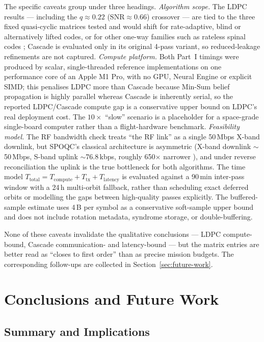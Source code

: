 \documentclass{UoYCSproject}
\begin{document}
The specific caveats group under three headings. \emph{Algorithm scope.}
The LDPC results --- including the $q \approx 0.22$
($\mathrm{SNR}\!\approx\!0.66$) crossover --- are tied to the three fixed
quasi-cyclic matrices tested and would shift for rate-adaptive, blind or
alternatively lifted codes, or for other one-way families such as rateless
spinal codes \cite{wen_novel_2019}; Cascade is evaluated only in its
original 4-pass variant, so reduced-leakage refinements
\cite{pacher_information_2015} are not captured.
\emph{Compute platform.} Both Part~I timings were produced by scalar,
single-threaded reference implementations on one performance core of an
Apple M1 Pro, with no GPU, Neural Engine or explicit SIMD; this penalises
LDPC more than Cascade because Min-Sum belief propagation is highly
parallel whereas Cascade is inherently serial, so the reported
LDPC/Cascade compute gap is a conservative upper bound on LDPC's real
deployment cost. The $10\times$ ``slow'' scenario is a placeholder for a
space-grade single-board computer rather than a flight-hardware benchmark.
\emph{Feasibility model.} The RF bandwidth check treats ``the RF link''
as a single 50\,Mbps X-band downlink, but SPOQC's classical architecture
is asymmetric (X-band downlink $\sim$50\,Mbps, S-band uplink
$\sim$76.8\,kbps, roughly 650$\times$ narrower
\cite{noauthor_hubs_nodate}), and under reverse reconciliation the uplink
is the true bottleneck for both algorithms. The time model
$T_{\text{total}} = T_{\text{compute}} + T_{\text{tx}} + T_{\text{latency}}$
is evaluated against a 90\,min inter-pass window with a 24\,h
multi-orbit fallback, rather than scheduling exact deferred orbits or
modelling the gaps between high-quality passes explicitly. The buffered-sample estimate uses 4\,B per symbol as a
conservative soft-sample upper bound and does not include rotation
metadata, syndrome storage, or double-buffering.

None of these caveats invalidate the qualitative conclusions --- LDPC
compute-bound, Cascade communication- and latency-bound --- but the matrix
entries are better read as ``closes to first order'' than as precise
mission budgets. The corresponding follow-ups are collected in
Section~\ref{sec:future-work}.

\chapter{Conclusions and Future Work}
\label{cha:conclusion}

\section{Summary and Implications}
\label{sec:summary}
\end{document}
